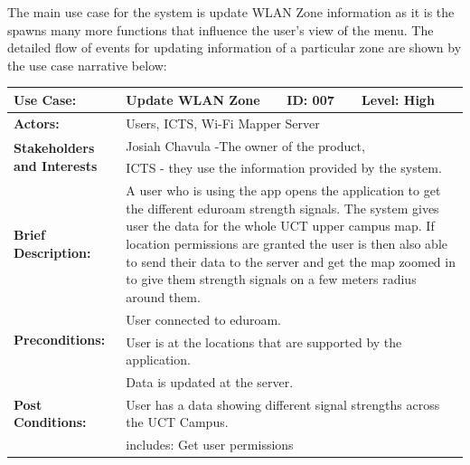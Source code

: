 The main use case for the system is update WLAN Zone information as it is the spawns many more functions that influence the user's view of the menu. The detailed flow of events for updating information of a particular zone are shown by the use case narrative below:
\newline
\begin{tabular}{|p{}|p{}|p{}|p{}|}
	\hline
	\textbf{Use Case:} & Update WLAN Zone & \textbf{ID:} 007 & \textbf{Level:} High
	\\\hline
	\textbf{Actors:} & \multicolumn{3}{|l|}{Users, ICTS, Wi-Fi Mapper Server} \\\hline
	\multirow{2}{0.2\textwidth}{\textbf{Stakeholders and Interests}} &
	\multicolumn{3}{|p{0.79\textwidth}|}{
		Josiah Chavula -The owner of the product,
	} \\
	& \multicolumn{3}{|p{0.79\textwidth}|}{
		ICTS - they use the information provided by the system.
	} \\\hline
	\textbf{Brief Description:} & \multicolumn{3}{|p{0.79\textwidth}|}{
	A user who is using the app opens the application to get the different eduroam strength signals. The system gives user the data for the whole UCT upper campus map. If location permissions are granted the user is then also able to send their data to the server and get the map zoomed in to give them strength signals on a few meters radius around them.} \\\hline
	\multirow{2}{0.2\textwidth}{\textbf{Preconditions:}}
	& \multicolumn{3}{|p{0.79\textwidth}|}{
		User connected to eduroam.} \\
	& \multicolumn{3}{|p{0.79\textwidth}|}{
		User is at the locations that are supported by the application.} \\\hline
	\multirow{3}{0.2\textwidth}{\textbf{Post Conditions:}}
	& \multicolumn{3}{|p{0.79\textwidth}|}{Data is updated at the server.} \\
	& \multicolumn{3}{|p{0.79\textwidth}|}{User has a data showing different signal strengths across the UCT Campus.}  \\\hline
	\multirow{1}{0.2\textwidth}{\textbf{Related Use Cases:}}
	& \multicolumn{3}{|p{0.79\textwidth}|}{includes: Get user permissions} \\\hline
\end{tabular}

